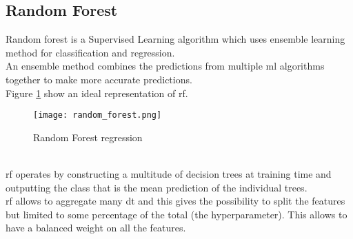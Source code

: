 \subsection{Random Forest}
Random forest is a Supervised Learning algorithm which uses ensemble learning method for classification and regression.
\\
An ensemble method combines the predictions from multiple \gls{ml} algorithms together to make more accurate predictions.
\\
Figure \ref{fig:random_forest} show an ideal representation of \gls{rf}.
\begin{figure}[h]
    \centering
    \texttt{[image: random\_forest.png]} 
	\caption{Random Forest regression}
    \label{fig:random_forest}
\end{figure} 
\\
\gls{rf} operates by constructing a multitude of decision trees at training time and outputting the class that is the mean prediction of the individual trees.
\\
\gls{rf} allows to aggregate many \gls{dt} and this gives the possibility to split the features but limited to some percentage of the total (the hyperparameter). This allows to have a balanced weight on all the features.